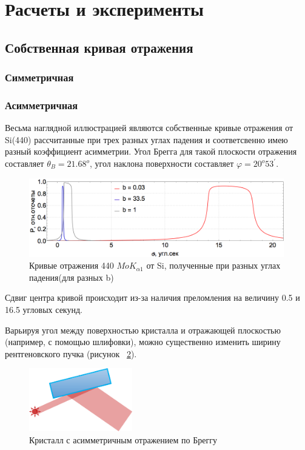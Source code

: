 \section{Расчеты и эксперименты}
\subsection{Собственная кривая отражения}
\subsubsection{Симметричная}

\subsubsection{Асимметричная}
Весьма наглядной иллюстрацией являются собственные кривые отражения от Si(440) рассчитанные при
трех разных углах падения и соответсвенно имею разный коэффициент асимметрии. Угол
Брегга для такой плоскости отражения составляет $\theta_B = 21.68^o$, угол наклона поверхности
составляет $\varphi = 20^o 53^{'}$.

\begin{figure}[H]
\centering
\includegraphics[width=0.99\textwidth]{images/rocking_curve_assym_3.png}
\caption{Кривые отражения 440 $MoK_{\alpha 1}$ от Si, полученные при разных углах падения(для разных b)}
\label{ris:rocking_curve_assym_3}
\end{figure}
Сдвиг центра кривой происходит из-за наличия преломления на величину 0.5 и 16.5 угловых секунд.

Варьируя угол между поверхностью кристалла и отражающей плоскостью (например, с помощью шлифовки),
можно существенно изменить ширину рентгеновского пучка (рисунок ~\ref{ris:assym_width_beam}).
\begin{figure}[H]
 \centering
 \includegraphics[width=0.4\textwidth]{images/assym_width_beam.png}
 \caption{Кристалл с асимметричным отражением по Бреггу}
 \label{ris:assym_width_beam}
\end{figure}


